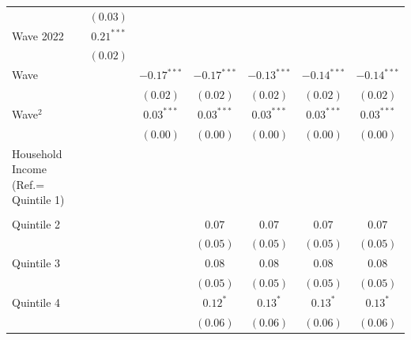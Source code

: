 \documentclass[
  12pt,
  a4paper,
]{article}
\begin{document}
\begin{table}[!ht]
\begin{center}
{\begin{tabular}{l c c c c c c}
                                    & $(0.03)$      &               &               &               &               &               \\
\quad Wave 2022                     & $0.21^{***}$  &               &               &               &               &               \\
                                    & $(0.02)$      &               &               &               &               &               \\
Wave                                &               & $-0.17^{***}$ & $-0.17^{***}$ & $-0.13^{***}$ & $-0.14^{***}$ & $-0.14^{***}$ \\
                                    &               & $(0.02)$      & $(0.02)$      & $(0.02)$      & $(0.02)$      & $(0.02)$      \\
Wave$^2$                            &               & $0.03^{***}$  & $0.03^{***}$  & $0.03^{***}$  & $0.03^{***}$  & $0.03^{***}$  \\
                                    &               & $(0.00)$      & $(0.00)$      & $(0.00)$      & $(0.00)$      & $(0.00)$      \\
Household Income (Ref.= Quintile 1) &               &               &               &               &               &               \\
                                    &               &               &               &               &               &               \\
\quad Quintile 2                    &               &               & $0.07$        & $0.07$        & $0.07$        & $0.07$        \\
                                    &               &               & $(0.05)$      & $(0.05)$      & $(0.05)$      & $(0.05)$      \\
\quad Quintile 3                    &               &               & $0.08$        & $0.08$        & $0.08$        & $0.08$        \\
                                    &               &               & $(0.05)$      & $(0.05)$      & $(0.05)$      & $(0.05)$      \\
\quad Quintile 4                    &               &               & $0.12^{*}$    & $0.13^{*}$    & $0.13^{*}$    & $0.13^{*}$    \\
                                    &               &               & $(0.06)$      & $(0.06)$      & $(0.06)$      & $(0.06)$      \\

\end{tabular}}
\end{center}
\end{table}
\end{document}
